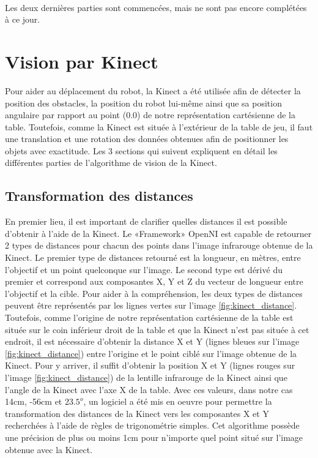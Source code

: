 \paragraph{}Les deux dernières parties sont commencées, mais ne sont pas encore complétées à ce jour.

\section{Vision par Kinect}
Pour aider au déplacement du robot, la Kinect a été utilisée afin de détecter la position des obstacles, la position du robot lui-même ainsi que sa position angulaire par rapport au point (0.0) de notre représentation cartésienne de la table. Toutefois, comme la Kinect est située à l'extérieur de la table de jeu, il faut une translation et une rotation des données obtenues afin de positionner les objets avec exactitude. Les 3 sections qui suivent expliquent en détail les différentes parties de l'algorithme de vision de la Kinect.

\subsection{Transformation des distances}
En premier lieu, il est important de clarifier quelles distances il est possible d'obtenir à l'aide de la Kinect. Le «Framework» OpenNI est capable de retourner 2 types de distances pour chacun des points dans l'image infrarouge obtenue de la Kinect. Le premier type de distances retourné est la longueur, en mètres, entre l'objectif et un point quelconque sur l'image. Le second type est dérivé du premier et correspond aux composantes X, Y et Z du vecteur de longueur entre l'objectif et la cible. Pour aider à la compréhension, les deux types de distances peuvent être représentés par les lignes vertes sur l'image \ref{fig:kinect_distance}. Toutefois, comme l'origine de notre représentation cartésienne de la table est située sur le coin inférieur droit de la table et que la Kinect n'est pas située à cet endroit, il est nécessaire d'obtenir la distance X et Y (lignes bleues sur l'image \ref{fig:kinect_distance}) entre l'origine et le point ciblé sur l'image obtenue de la Kinect. Pour y arriver, il suffit d'obtenir la position X et Y (lignes rouges sur l'image \ref{fig:kinect_distance}) de la lentille infrarouge de la Kinect ainsi que l'angle de la Kinect avec l'axe X de la table. Avec ces valeurs, dans notre cas 14cm, -56cm et $23.5^o$, un logiciel a été mis en oeuvre pour permettre la transformation des distances de la Kinect vers les composantes X et Y recherchées à l'aide de règles de trigonométrie simples. Cet algorithme possède une précision de plus ou moins 1cm pour n'importe quel point situé sur l'image obtenue avec la Kinect. 

